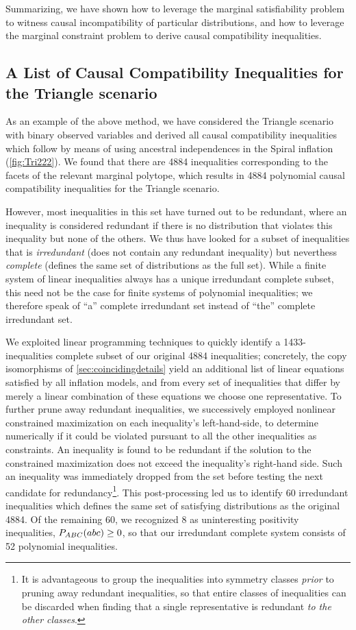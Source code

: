 \documentclass[aps,english,10pt,superscriptaddress,onecolumn,twoside,longbibliography,pra,floatfix,fleqn,nofootinbib]{revtex4-1}
\theoremstyle{definition}
\newcounter{example}[section]
\newcommand{\p}[2][]{{P_{#1}}\parenths{#2}}
\DeclarePairedDelimiter{\parenths}{\lparen}{\rparen}
\begin{document}
Summarizing, we have shown how to leverage the marginal satisfiability problem to witness causal incompatibility of particular distributions, and how to leverage the marginal constraint problem to derive causal compatibility inequalities.

\subsection{A List of Causal Compatibility Inequalities for the Triangle scenario}
\label{sec:CCineqs}

As an example of the above method, we have considered the Triangle scenario with binary observed variables and derived all causal compatibility inequalities which follow by means of using ancestral independences in the Spiral inflation (\cref{fig:Tri222}). We found that there are 4884 inequalities corresponding to the facets of the relevant marginal polytope, which results in 4884 polynomial causal compatibility inequalities for the Triangle scenario.

However, most inequalities in this set have turned out to be redundant, where an inequality is considered redundant if there is no distribution that violates this inequality but none of the others. We thus have looked for a subset of inequalities that is \emph{irredundant} (does not contain any redundant inequality) but neverthess \emph{complete} (defines the same set of distributions as the full set). While a finite system of linear inequalities always has a unique irredundant complete subset, this need not be the case for finite systems of polynomial inequalities; we therefore speak of ``a'' complete irredundant set instead of ``the'' complete irredundant set.

We exploited linear programming techniques to quickly identify a 1433-inequalities complete subset of our original 4884 inequalities; concretely, the copy isomorphisms of \cref{sec:coincidingdetails} yield an additional list of linear equations satisfied by all inflation models, and from every set of inequalities that differ by merely a linear combination of these equations we choose one representative. To further prune away redundant inequalities, we successively employed nonlinear constrained maximization on each inequality's left-hand-side, to determine numerically if it could be violated pursuant to all the other inequalities as constraints. An inequality is found to be redundant if the solution to the constrained maximization does not exceed the inequality's right-hand side. Such an inequality was immediately dropped from the set before testing the next candidate for redundancy\footnote{It is advantageous to group the inequalities into symmetry classes \emph{prior} to pruning away redundant inequalities, so that entire classes of inequalities can be discarded when finding that a single representative is redundant \emph{to the other classes}.}. This post-processing led us to identify 60 irredundant inequalities which defines the same set of satisfying distributions as the original 4884. Of the remaining 60, we recognized 8 as uninteresting positivity inequalities, $\p[ABC]{abc}\geq 0$, so that our irredundant complete system consists of 52 polynomial inequalities.
\end{document}
